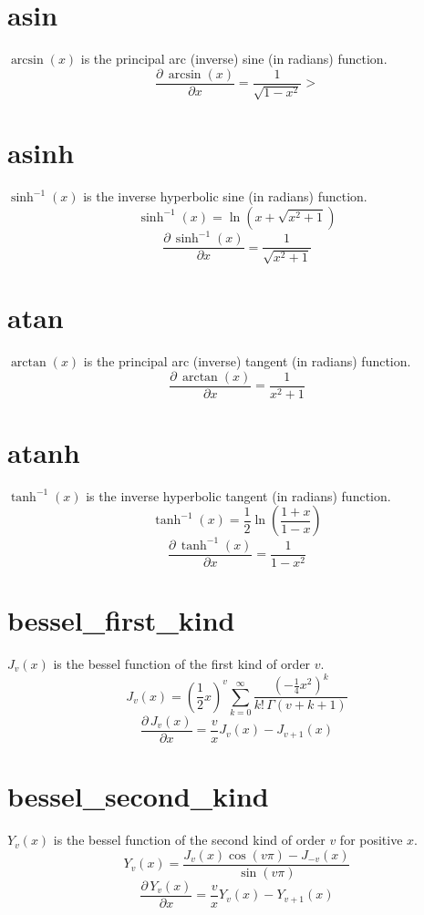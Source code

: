 \section{asin}\label{asin-appendix.section}
$\arcsin(x)$ is the principal arc (inverse) sine (in radians) function.
%
\[
\frac{\partial \, \arcsin(x)}{\partial x} = \frac{1}{\sqrt{1-x^2}}>
\]

\section{asinh}\label{asinh-appendix.section}
$\sinh^{-1}(x)$ is the inverse hyperbolic sine (in radians) function.
%
\[
\sinh^{-1}(x)=\ln\left(x+\sqrt{x^2+1}\right)
\]
%
\[
\frac{\partial \, \sinh^{-1}(x)}{\partial x} = \frac{1}{\sqrt{x^2+1}}
\]

\section{atan}\label{atan-appendix.section}
$\arctan(x)$ is the principal arc (inverse) tangent (in radians) function.
%
\[
\frac{\partial \, \arctan(x)}{\partial x} = \frac{1}{x^2+1}
\]

\section{atanh}\label{atanh-appendix.section}
$\tanh^{-1}(x)$ is the inverse hyperbolic tangent (in radians) function.
%
\[
\tanh^{-1}(x)=\frac{1}{2}\ln\left(\frac{1+x}{1-x}\right)
\]
%
\[
\frac{\partial \, \tanh^{-1}(x)}{\partial x} = \frac{1}{1-x^2}
\]

\section{bessel\_first\_kind}\label{bessel-first-kind-appendix.section}
$J_v(x)$ is the bessel function of the first kind of order $v$.
%
\[
J_v(x)=\left(\frac{1}{2}x\right)^v
	\sum_{k=0}^\infty \frac{\left(-\frac{1}{4}x^2\right)^k}{k!\, \Gamma(v+k+1)}
\]
%
\[
\frac{\partial \, J_v(x)}{\partial x} = \frac{v}{x}J_v(x)-J_{v+1}(x)
\]

\section{bessel\_second\_kind}\label{bessel-second-kind-appendix.section}
$Y_v(x)$ is the bessel function of the second kind of order $v$ for positive $x$.
%
\[
Y_v(x)=\frac{J_v(x)\cos(v\pi)-J_{-v}(x)}{\sin(v\pi)}
\]
%
\[
\frac{\partial \, Y_v(x)}{\partial x} = \frac{v}{x}Y_v(x)-Y_{v+1}(x)
\]

